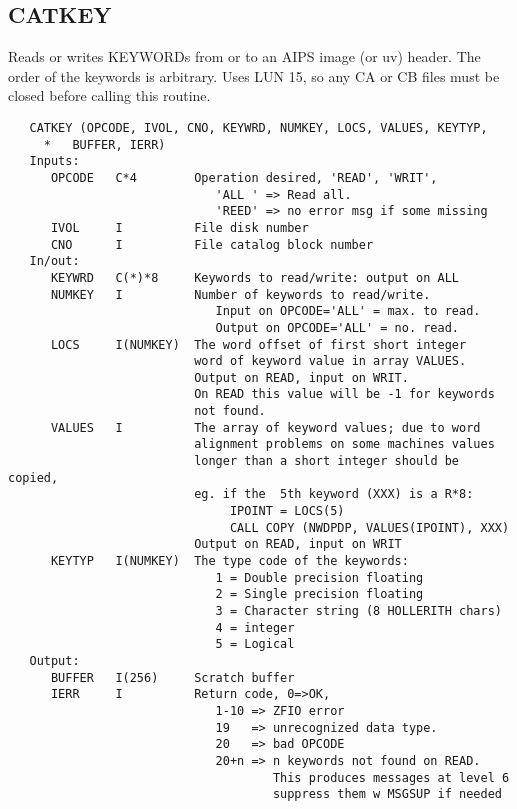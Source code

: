 \subsection{CATKEY}
Reads or writes KEYWORDs from or to an AIPS image (or uv) header.
The order of the keywords is arbitrary.  Uses LUN 15, so any CA or
CB files must be closed before calling this routine.
\begin{verbatim}
   CATKEY (OPCODE, IVOL, CNO, KEYWRD, NUMKEY, LOCS, VALUES, KEYTYP,
     *   BUFFER, IERR)
   Inputs:
      OPCODE   C*4        Operation desired, 'READ', 'WRIT',
                             'ALL ' => Read all.
                             'REED' => no error msg if some missing
      IVOL     I          File disk number
      CNO      I          File catalog block number
   In/out:
      KEYWRD   C(*)*8     Keywords to read/write: output on ALL
      NUMKEY   I          Number of keywords to read/write.
                             Input on OPCODE='ALL' = max. to read.
                             Output on OPCODE='ALL' = no. read.
      LOCS     I(NUMKEY)  The word offset of first short integer
                          word of keyword value in array VALUES.
                          Output on READ, input on WRIT.
                          On READ this value will be -1 for keywords
                          not found.
      VALUES   I          The array of keyword values; due to word
                          alignment problems on some machines values
                          longer than a short integer should be copied,
                          eg. if the  5th keyword (XXX) is a R*8:
                               IPOINT = LOCS(5)
                               CALL COPY (NWDPDP, VALUES(IPOINT), XXX)
                          Output on READ, input on WRIT
      KEYTYP   I(NUMKEY)  The type code of the keywords:
                             1 = Double precision floating
                             2 = Single precision floating
                             3 = Character string (8 HOLLERITH chars)
                             4 = integer
                             5 = Logical
   Output:
      BUFFER   I(256)     Scratch buffer
      IERR     I          Return code, 0=>OK,
                             1-10 => ZFIO error
                             19   => unrecognized data type.
                             20   => bad OPCODE
                             20+n => n keywords not found on READ.
                                     This produces messages at level 6
                                     suppress them w MSGSUP if needed
\end{verbatim}



